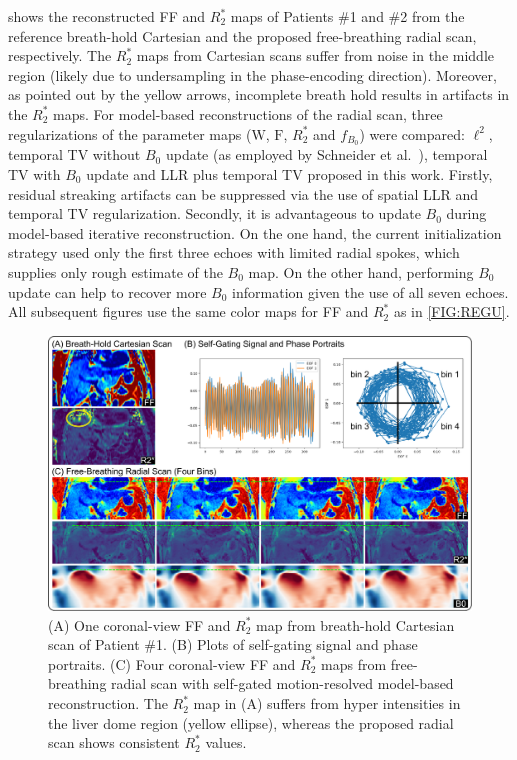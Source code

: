 \documentclass[journal,twoside,web]{ieeecolor}
\begin{document}
 shows the reconstructed FF and $R_2^*$ maps of Patients \#1 and \#2
from the reference breath-hold Cartesian and the proposed free-breathing radial scan, 
respectively. 
The $R_2^*$ maps from Cartesian scans suffer from noise in the middle region 
(likely due to undersampling in the phase-encoding direction). 
Moreover, as pointed out by the yellow arrows, 
incomplete breath hold results in artifacts in the $R_2^*$ maps.
For model-based reconstructions of the radial scan, 
three regularizations of the parameter maps ($\mathrm{W}$, $\mathrm{F}$, $R_2^*$ and $f_{B_0}$) 
were compared: 
$\ell^2$, temporal TV without $B_0$ update 
(as employed by Schneider et al.~\cite{schneider_2020_mobawfr2s}), 
temporal TV with $B_0$ update and 
LLR plus temporal TV proposed in this work. 
Firstly, residual streaking artifacts can be suppressed via 
the use of spatial LLR and temporal TV regularization.
Secondly, it is advantageous to update $B_0$ during model-based iterative reconstruction. 
On the one hand, the current initialization strategy used 
only the first three echoes with limited radial spokes, 
which supplies only rough estimate of the $B_0$ map.
On the other hand, performing $B_0$ update can help to recover more $B_0$ information 
given the use of all seven echoes.
All subsequent figures use the same color maps for FF and $R_2^*$ as in \cref{FIG:REGU}.

\begin{figure}
	\centering 
	\includegraphics[width=\textwidth]{../../figures/tan6.pdf}
	\caption{(A) One coronal-view FF and $R_2^*$ map 
		from breath-hold Cartesian scan of Patient \#1. 
		(B) Plots of self-gating signal and phase portraits. 
		(C) Four coronal-view FF and $R_2^*$ maps from 
		free-breathing radial scan with self-gated motion-resolved 
		model-based reconstruction. 
		The $R_2^*$ map in (A) suffers from 
		hyper intensities in the liver dome region (yellow ellipse), 
		whereas the proposed radial scan shows consistent $R_2^*$ values.}
	\label{FIG:SSA}
\end{figure}
\end{document}
